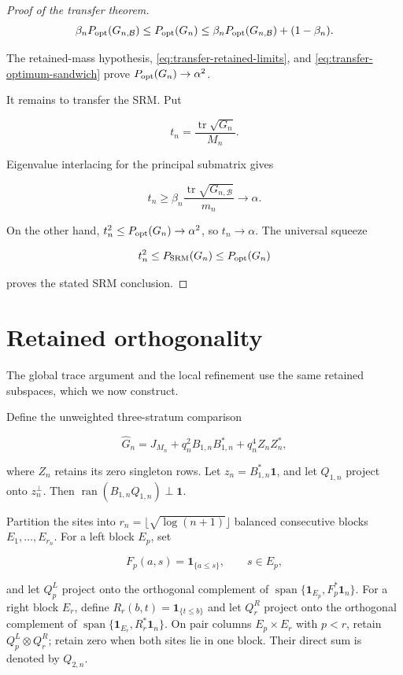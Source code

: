 \begin{proof}[Proof of the transfer theorem]
\begin{equation}
\label{eq:transfer-optimum-sandwich}
\beta_nP_{\rm opt}(G_{n,\mathcal B})
\le P_{\rm opt}(G_n)
\le\beta_nP_{\rm opt}(G_{n,\mathcal B})+(1-\beta_n).
\end{equation}

The retained-mass hypothesis, \eqref{eq:transfer-retained-limits}, and
\eqref{eq:transfer-optimum-sandwich} prove
\(P_{\rm opt}(G_n)\to\alpha^2\).

It remains to transfer the SRM. Put

\[
t_n=\frac{\operatorname{tr}\sqrt{G_n}}{M_n}.
\]

Eigenvalue interlacing for the principal submatrix gives

\[
t_n\ge
\beta_n\frac{\operatorname{tr}\sqrt{G_{n,\mathcal B}}}{m_n}
\longrightarrow\alpha.
\]

On the other hand, \(t_n^2\le P_{\rm opt}(G_n)\to\alpha^2\), so
\(t_n\to\alpha\). The universal squeeze

\[
t_n^2\le P_{\rm SRM}(G_n)\le P_{\rm opt}(G_n)
\]

proves the stated SRM conclusion.
\end{proof}

\section{Retained orthogonality}
\label{supp:retained-orthogonality}

The global trace argument and the local refinement use the same retained
subspaces, which we now construct.

Define the unweighted three-stratum comparison

\begin{equation}\label{eq:supp-unweighted-three-stratum}
 \widehat G_n=J_{M_n}+q_n^2B_{1,n}B_{1,n}^*
 +q_n^4Z_nZ_n^*,
\end{equation}

where \(Z_n\) retains its zero singleton rows.  Let
\(z_n=B_{1,n}^*\mathbf1\), and let \(Q_{1,n}\) project onto \(z_n^\perp\).
Then \(\operatorname{ran}(B_{1,n}Q_{1,n})\perp\mathbf1\).

Partition the sites into
\(r_n=\lfloor\sqrt{\log(n+1)}\rfloor\) balanced consecutive blocks
\(E_1,\ldots,E_{r_n}\).  For a left block \(E_p\), set

\[
 F_p(a,s)=\mathbf1_{\{a\le s\}},\qquad s\in E_p,
\]

and let \(Q_p^L\) project onto the orthogonal complement of
\(\operatorname{span}\{\mathbf1_{E_p},F_p^*\mathbf1_n\}\).  For a right
block \(E_r\), define
\(R_r(b,t)=\mathbf1_{\{t\le b\}}\) and let \(Q_r^R\) project onto the
orthogonal complement of
\(\operatorname{span}\{\mathbf1_{E_r},R_r^*\mathbf1_n\}\).  On pair
columns \(E_p\times E_r\) with \(p<r\), retain
\(Q_p^L\otimes Q_r^R\); retain zero when both sites lie in one block.  Their
direct sum is denoted by \(Q_{2,n}\).

